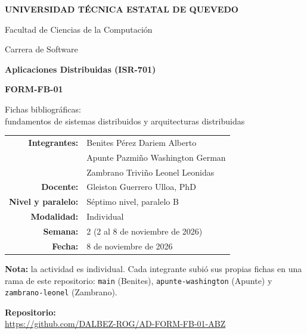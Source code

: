 \documentclass[12pt,a4paper]{article}
\newcommand{\repourl}{https://github.com/DALBEZ-ROG/AD-FORM-FB-01-ABZ}
\newcommand{\fecha}{8 de noviembre de 2026}
\begin{document}
\begin{center}
  {\Large\bfseries UNIVERSIDAD TÉCNICA ESTATAL DE QUEVEDO\par}
  \vspace{4pt}
  {\large Facultad de Ciencias de la Computación\par}
  {\large Carrera de Software\par}
  \vspace{1.6cm}
  {\large\bfseries Aplicaciones Distribuidas (ISR-701)\par}
  \vspace{0.8cm}
  {\Large\bfseries FORM-FB-01\par}
  \vspace{4pt}
  {\large Fichas bibliográficas:\\ fundamentos de sistemas distribuidos y arquitecturas distribuidas\par}
\end{center}

\vspace{1.6cm}
\begin{center}
\renewcommand{\arraystretch}{1.5}
\begin{tabular}{>{\bfseries}r l}
  Integrantes: & Benites Pérez Dariem Alberto \\
               & Apunte Pazmiño Washington German \\
               & Zambrano Triviño Leonel Leonidas \\
  Docente:     & Gleiston Guerrero Ulloa, PhD \\
  Nivel y paralelo: & Séptimo nivel, paralelo B \\
  Modalidad:   & Individual \\
  Semana:      & 2 (2 al 8 de noviembre de 2026) \\
  Fecha:       & \fecha \\
\end{tabular}
\end{center}

\vspace{0.8cm}
\begin{center}
\begin{minipage}{0.85\textwidth}
\small\textbf{Nota:} la actividad es individual. Cada integrante subió sus propias fichas en una rama de este repositorio:
\texttt{main} (Benites), \texttt{apunte-washington} (Apunte) y \texttt{zambrano-leonel} (Zambrano).
\end{minipage}
\end{center}

\vfill
\begin{center}
  {\bfseries Repositorio:}\\[4pt]
  {\small\url{\repourl}}
\end{center}
\vspace{1cm}
\end{document}
